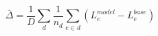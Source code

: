 \par\needspace{70pt}\begin{minipage}{\linewidth}
\begin{equation}\overline\Delta=\frac1D\sum_d\frac1{n_d}\sum_{e\in d}(L_e^{model}-L_e^{base})\label{eq:17}\end{equation}
\end{minipage}\par
